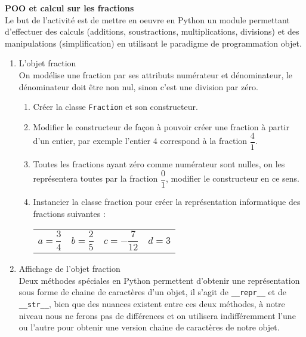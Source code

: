 \documentclass[11pt,a4paper]{article}
\begin{document}

\pythonmode

\begin{Exo}{\textbf{POO et calcul sur les fractions}}\\
	Le but de l'activité est de mettre en oeuvre en Python un module permettant d'effectuer des calculs (additions, soustractions, multiplications, divisions) et des manipulations (simplification) en utilisant le paradigme de programmation objet.
	\begin{enumerate}
		\item L'objet fraction\\
	On modélise une fraction par ses attributs numérateur et dénominateur, le dénominateur doit être non nul, sinon c'est une division par zéro.

		\begin{enumerate}
			\item Créer la classe {\tt Fraction} et son constructeur.
			\item Modifier le constructeur de façon à pouvoir créer une fraction à partir d'un entier, par exemple l'entier 4 correspond à la fraction $\dfrac{4}{1}$.
			\item Toutes les fractions ayant zéro comme numérateur sont nulles, on les représentera toutes par la fraction $\dfrac{0}{1}$, modifier le constructeur en ce sens.
			\item Instancier la classe fraction pour créer la représentation informatique des fractions suivantes :\\
	\renewcommand{\arraystretch}{1.5}
	\begin{tabularx}{0.6\textwidth}{XXXX}
		$a=\dfrac{3}{4}$ & $b=\dfrac{2}{5}$ & $c=-\dfrac{7}{12}$ & $d=3$ \\
	\end{tabularx}
		\end{enumerate}
	\item Affichage de l'objet fraction\\
	\danger \; Deux méthodes spéciales en Python permettent d'obtenir une représentation sous forme de chaine de caractères d'un objet, il s'agit de {\tt \_\_repr\_\_} et de {\tt \_\_str\_\_}, bien que des nuances existent entre ces deux méthodes, à notre niveau nous ne ferons pas de différences et on utilisera indifféremment l'une ou l'autre pour obtenir une version \og chaine de caractères \fg de notre objet.


\end{enumerate}
\end{Exo}
\end{document}
